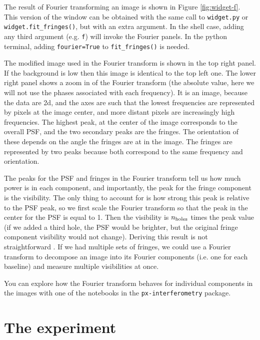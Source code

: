 \documentclass[11pt]{article}
\begin{document}
The result of Fourier transforming an image is shown in Figure \ref{fig:widget-f}. This version of the window can be obtained with the same call to \texttt{widget.py} or \texttt{widget.fit\_fringes()}, but with an extra argument. In the shell case, adding any third argument (e.g. \texttt{f}) will invoke the Fourier panels. In the python terminal, adding \texttt{fourier=True} to \texttt{fit\_fringes()} is needed.

The modified image used in the Fourier transform is shown in the top right panel. If the background is low then this image is identical to the top left one. The lower right panel shows a zoom in of the Fourier transform (the absolute value, here we will not use the phases associated with each frequency). It is an image, because the data are 2d, and the axes are such that the lowest frequencies are represented by pixels at the image center, and more distant pixels are increasingly high frequencies. The highest peak, at the center of the image corresponds to the overall PSF, and the two secondary peaks are the fringes. The orientation of these depends on the angle the fringes are at in the image. The fringes are represented by two peaks because both correspond to the same frequency and orientation.

The peaks for the PSF and fringes in the Fourier transform tell us how much power is in each component, and importantly, the peak for the fringe component is the visibility. The only thing to account for is how strong this peak is relative to the PSF peak, so we first scale the Fourier transform so that the peak in the center for the PSF is equal to 1. Then the visibility is $n_{\rm holes}$ times the peak value (if we added a third hole, the PSF would be brighter, but the original fringe component visibility would not change). Deriving this result is not straightforward \citep[e.g.][section 2.4.3]{2011psi..book.....G}. If we had multiple sets of fringes, we could use a Fourier transform to decompose an image into its Fourier components (i.e. one for each baseline) and measure multiple visibilities at once.

You can explore how the Fourier transform behaves for individual components in the images with one of the notebooks in the \texttt{px-interferometry} package.

\clearpage
\section{The experiment}
\end{document}
